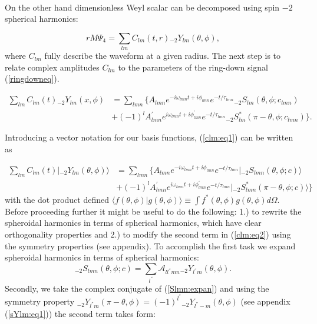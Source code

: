 \documentclass[11pt]{article}
\newcommand{\ket}[1]{|#1\rangle}
\newcommand{\braket}[2]{\langle #1|#2\rangle}
\begin{document}
\noindent\\
On the other hand dimensionless Weyl scalar can be decomposed using spin $\minus 2$ spherical harmonics:

\begin{equation}
rM\Psi_4 = \sum_{lm} C_{lm}(t,r) {}_{\minus 2}Y_{lm}(\theta, \phi),
\end{equation} 
where $C_{lm}$ fully describe the waveform at a given radius. The next step is to relate complex amplitudes $C_{lm}$ to the parameters of the ring-down signal (\ref{ringdowneq}). 

\begin{equation} \label{clm:eq1}
\begin{aligned}
\sum_{lm} C_{lm}(t) {}_{\minus 2}Y_{lm}(x, \phi) & = \sum_{lmn} \Big\{ A_{lmn} e^{-i\omega_{lmn}t+i\phi_{lmn}}e^{-t/\tau_{lmn}} {}_{\minus 2}S_{lm}(\theta, \phi ;c_{lmn})\\
& + (-1)^l A^{'}_{lmn} e^{i\omega_{lmn}t+i\phi^{'}_{lmn}}e^{-t/\tau_{lmn}} {}_{\minus 2}S^{*}_{lm}(\pi-\theta, \phi; c_{lmn}) \Big\}.
\end{aligned}
\end{equation}

\noindent
Introducing a vector notation for our basis functions, (\ref{clm:eq1}) can be written as  

\begin{equation} \label{clm:eq2}
\begin{aligned}
\sum_{lm} C_{lm}(t) \ket{{}_{\minus 2}Y_{lm}(\theta, \phi)} & = \sum_{lmn} \Big\{ A_{lmn} e^{-i\omega_{lmn}t+i\phi_{lmn}}e^{-t/\tau_{lmn}} \ket{{}_{\minus 2}S_{lmn}(\theta, \phi ;c)}\\
& + (-1)^l A^{'}_{lmn} e^{i\omega_{lmn}t+i\phi^{'}_{lmn}}e^{-t/\tau_{lmn}} \ket{{}_{\minus 2}S^{*}_{lmn}(\pi-\theta, \phi; c)} \Big\}
\end{aligned}
\end{equation}
with the dot product defined $\braket{f(\theta, \phi)}{g(\theta, \phi)} \equiv \int{f^{*}(\theta, \phi) g(\theta, \phi) d\Omega}$. Before proceeding further it might be useful to do the following: 1.) to rewrite the spheroidal harmonics in terms of spherical harmonics, which have clear orthogonality properties and 2.) to modify the second term in (\ref{clm:eq2}) using the symmetry properties (see appendix). To accomplish the first task we expand spheroidal harmonics in terms of spherical harmonics:
\begin{equation} \label{Slmn:expan}
{}_{\minus 2}S_{lmn}(\theta, \phi ;c) = \sum_{l^{''}} \mathcal{A}_{ll^{''}mn} {}_{\minus 2}Y_{l^{''}m}(\theta, \phi).
\end{equation}
\noindent
Secondly, we take the complex conjugate of (\ref{Slmn:expan}) and using the symmetry property ${}_{\minus 2}Y_{l^{''}m}(\pi-\theta, \phi) = (-1)^{l^{''}} {}_{\minus 2}Y_{l^{''}-m}(\theta, \phi)$ (see appendix (\ref{sYlm:eq1})) the second term takes form:
\end{document}

